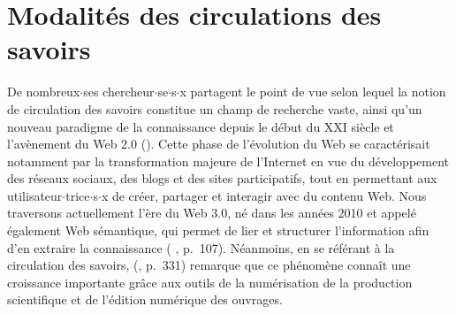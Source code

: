 \section{Modalités des circulations des savoirs}
De nombreux$\cdot$ses chercheur$\cdot$se$\cdot$s$\cdot$x partagent le point de vue selon lequel la notion de circulation des savoirs constitue un champ de recherche vaste, ainsi qu'un nouveau paradigme de la connaissance depuis le début du XXI\ieme{} siècle et l'avènement du Web \textsc{2.0} (\citealp{landais2014frederic,quet2014frederic}). Cette phase de l'évolution du Web se caractérisait notamment par la transformation majeure de l'Internet en vue du développement des réseaux sociaux, des blogs et des sites participatifs, tout en permettant aux utilisateur$\cdot$trice$\cdot$s$\cdot$x de créer, partager et interagir avec du contenu Web. Nous traversons actuellement l'ère du Web \textsc{3.0}, né dans les années 2010 et appelé également \og{}Web sémantique\fg{}, qui permet de lier et structurer l'information afin d'en extraire la connaissance (\citeauthor{andrade2013sociologie} \citeyear{andrade2013sociologie}, p.~107). Néanmoins, en se référant à la circulation des savoirs, \citeauthor{landais2014frederic} (\citeyear{landais2014frederic}, p.~331) remarque que ce phénomène connaît une croissance importante grâce aux outils de la numérisation de la production scientifique et de l'édition numérique des ouvrages.

